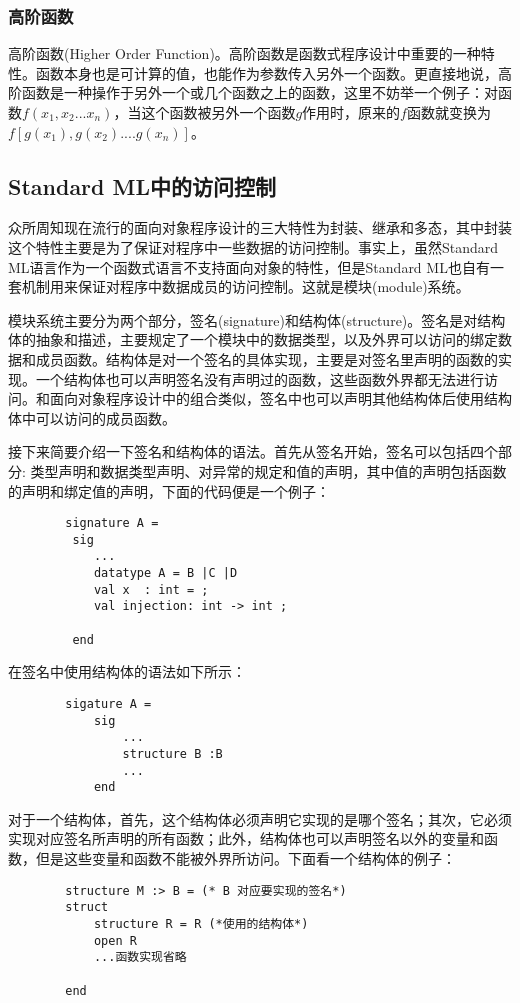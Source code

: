 \documentclass[openany,oneside]{book}
\theoremstyle{definition}
\theoremstyle{definition}
\begin{document}
	\subsubsection*{高阶函数}
	高阶函数(Higher Order Function)。高阶函数是函数式程序设计中重要的一种特性。函数本身也是可计算的值，也能作为参数传入另外一个函数。更直接地说，高阶函数是一种操作于另外一个或几个函数之上的函数，这里不妨举一个例子：对函数\(f\left(x_1,x_2...x_n \right) \)，当这个函数被另外一个函数\(g\)作用时，原来的\(f\)函数就变换为\(f\left[ g\left( x_1\right) ,g\left( x_2\right) ....g\left( x_n\right)\right]    \)。
	\subsection{Standard ML中的访问控制}
	众所周知现在流行的面向对象程序设计的三大特性为封装、继承和多态，其中封装这个特性主要是为了保证对程序中一些数据的访问控制。事实上，虽然Standard ML语言作为一个函数式语言不支持面向对象的特性，但是Standard ML也自有一套机制用来保证对程序中数据成员的访问控制。这就是模块(module)系统\cite{harper1989introduction}。
	
	
	模块系统主要分为两个部分，签名(signature)和结构体(structure)。签名是对结构体的抽象和描述，主要规定了一个模块中的数据类型，以及外界可以访问的绑定数据和成员函数。结构体是对一个签名的具体实现，主要是对签名里声明的函数的实现。一个结构体也可以声明签名没有声明过的函数，这些函数外界都无法进行访问。和面向对象程序设计中的组合类似，签名中也可以声明其他结构体后使用结构体中可以访问的成员函数。 
	
	接下来简要介绍一下签名和结构体的语法。首先从签名开始，签名可以包括四个部分: 类型声明和数据类型声明、对异常的规定和值的声明，其中值的声明包括函数的声明和绑定值的声明，下面的代码便是一个例子：
	\begin{lstlisting}
		signature A =
		 sig
			...
			datatype A = B |C |D
			val x  : int = ;
			val injection: int -> int ; 
		    
		 end
	\end{lstlisting}
	在签名中使用结构体的语法如下所示：
	\begin{lstlisting}
		sigature A =
			sig 
				...
				structure B :B
				...
			end
	\end{lstlisting}
	对于一个结构体，首先，这个结构体必须声明它实现的是哪个签名；其次，它必须实现对应签名所声明的所有函数；此外，结构体也可以声明签名以外的变量和函数，但是这些变量和函数不能被外界所访问。下面看一个结构体的例子：
	\begin{lstlisting}
		structure M :> B = (* B 对应要实现的签名*)
		struct
			structure R = R (*使用的结构体*)
			open R
			...函数实现省略
			
		end
	\end{lstlisting}	
	
\end{document}
